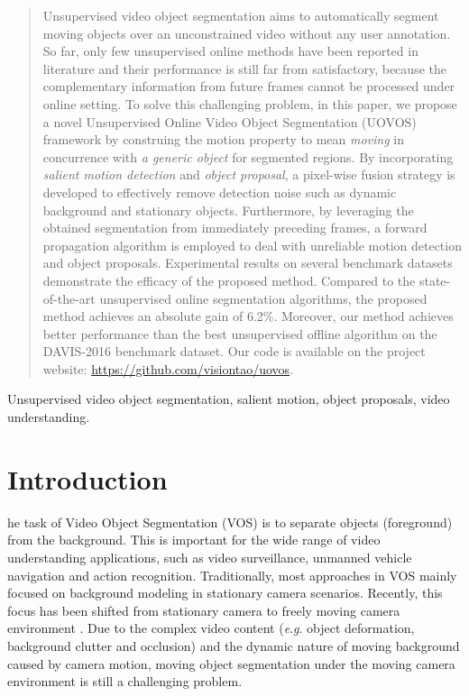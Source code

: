 \documentclass[journal]{IEEEtran}
\newcommand{\eg}{\textit{e}.\textit{g}. }
\begin{document}
\begin{abstract}

Unsupervised video object segmentation aims to automatically segment moving objects over an unconstrained video without any user annotation. So far, only few unsupervised online methods have been reported in literature and their performance is still far from satisfactory, because the complementary information from  future frames cannot be processed under online setting. To solve this challenging problem, in this paper, we propose a novel Unsupervised Online Video Object Segmentation (UOVOS) framework by construing the motion property to mean \emph{moving} in concurrence with \emph{a generic object} for segmented regions. By incorporating \emph{salient motion detection} and \emph{object proposal}, a pixel-wise fusion strategy is developed to effectively remove detection noise such as dynamic background and stationary objects. Furthermore, by leveraging the obtained segmentation from immediately preceding frames, a forward propagation algorithm is employed to deal with unreliable motion detection and object proposals. Experimental results on several benchmark datasets demonstrate the efficacy of the proposed method. Compared to the state-of-the-art unsupervised online segmentation algorithms, the proposed method achieves an absolute gain of 6.2\%. Moreover, our method achieves better performance than the best unsupervised offline algorithm on the DAVIS-2016 benchmark dataset. Our code is available on the project website: \url{https://github.com/visiontao/uovos}.


\end{abstract}

\begin{IEEEkeywords}
Unsupervised video object segmentation, salient motion, object proposals, video understanding.
\end{IEEEkeywords}
 \section{Introduction}
\label{sec:introduction}

he task of Video Object Segmentation (VOS) is to separate objects (foreground) from the background.
This is important for the wide range of video understanding applications,
such as video surveillance, unmanned vehicle navigation and action recognition.
Traditionally, most approaches in VOS mainly focused on background modeling in stationary camera scenarios.
Recently, this focus has been shifted from stationary camera to freely moving camera environment \cite{ICCV2013_Papazoglou,TIP2016_Yang,CVPR2014_Liu,TIP2018_Yang,CVPR2016_Perazzi,CVPR2017_Khoreva,CVPR2017_Tokmakov,CVPR2018_Yang,CVPR2018_Li}.
Due to the complex video content (\eg object deformation, background clutter and occlusion) and the dynamic nature of moving background caused by camera motion, moving object segmentation under the moving camera environment is still a challenging problem.
\end{document}
